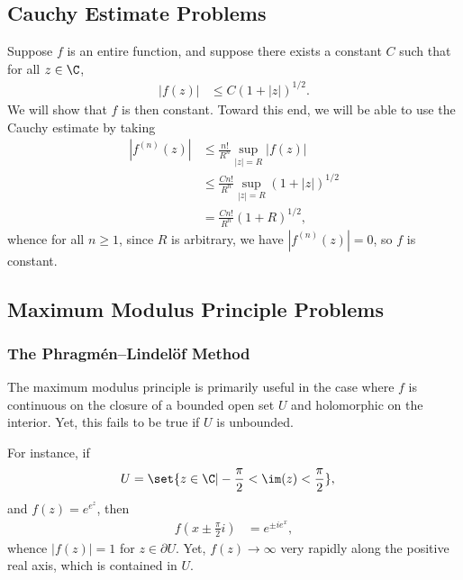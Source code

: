 \documentclass[10pt]{mypackage}
\begin{document}
\subsection{Cauchy Estimate Problems}%
\begin{example}
  Suppose $f$ is an entire function, and suppose there exists a constant $C$ such that for all $z\in \C$,
  \begin{align*}
    \left\vert f(z) \right\vert &\leq C\left( 1 + \left\vert z \right\vert \right)^{1/2}.
  \end{align*}
  We will show that $f$ is then constant. Toward this end, we will be able to use the Cauchy estimate by taking
  \begin{align*}
    \left\vert f^{(n)}(z) \right\vert &\leq \frac{n!}{R^{n}} \sup_{\left\vert z \right\vert = R} \left\vert f(z) \right\vert\\
                                      &\leq \frac{Cn!}{R^{n}} \sup_{\left\vert z \right\vert = R} \left( 1 + \left\vert z \right\vert \right)^{1/2}\\
                                      &= \frac{Cn!}{R^{n}} \left( 1 + R \right)^{1/2},
  \end{align*}
  whence for all $n\geq 1$, since $R$ is arbitrary, we have $\left\vert f^{(n)}\left( z \right) \right\vert = 0$, so $f$ is constant.
\end{example}
\subsection{Maximum Modulus Principle Problems}%

\subsubsection{The Phragmén--Lindelöf Method}%
The maximum modulus principle is primarily useful in the case where $f$ is continuous on the closure of a bounded open set $U$ and holomorphic on the interior. Yet, this fails to be true if $U$ is unbounded.\newline

For instance, if
\begin{align*}
  U &= \set{z\in \C | -\frac{\pi}{2} < \im(z) < \frac{\pi}{2}},
\end{align*}
and $f(z) = e^{e^{z}}$, then 
\begin{align*}
  f\left( x \pm \frac{\pi}{2}i \right) &= e^{\pm ie^{x}},
\end{align*}
whence $\left\vert f(z) \right\vert = 1$ for $z\in \partial U$. Yet, $f(z)\rightarrow \infty$ very rapidly along the positive real axis, which is contained in $U$.\newline
\end{document}
